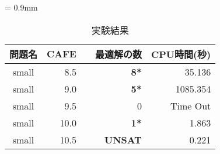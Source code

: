 \begin{table}[tb]
 \caption{実験結果}
 \centering
 \tabcolsep = 0.9mm
 \begin{tabular}{c|r|rr} \bhline
  問題名 & CAFE & 最適解の数　& CPU時間(秒) \\ \hline
  small  & 8.5   & {\bf 8*}             & 35.136            \\
  small  & 9.0   & {\bf 5*}             & 1085.354          \\
  small  & 9.5   & 0             & Time Out          \\
  small  & 10.0  & {\bf 1*}             & 1.863             \\
  small  & 10.5  & {\bf UNSAT}         & 0.221             \\ \hline
 \end{tabular}
 \label{tab:result}
\end{table}
